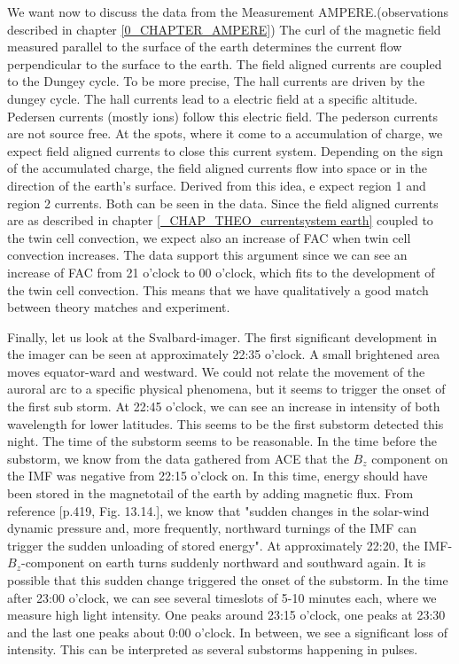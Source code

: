 \documentclass[10pt,a4paper]{article}
\begin{document}
We want now to discuss the data from the Measurement AMPERE.(observations described in chapter \ref{0_CHAPTER_AMPERE}) The  curl of the magnetic field measured parallel 
to the surface of the earth determines the current flow perpendicular to the surface to the earth. The field aligned currents are coupled to the Dungey cycle. To be more precise, The hall currents are driven by the dungey cycle. The hall currents lead to a electric field at a specific altitude. Pedersen currents (mostly ions) follow this electric field. The pederson currents are not source free. At the spots, where it come to a accumulation of charge, we expect field aligned currents to close this current system. Depending on the sign of the accumulated charge, the field aligned currents flow into space or in the direction of the earth's surface. 
Derived from this idea, e expect region 1 and region 2 currents. Both can be seen in the data. Since the field aligned currents are as described in chapter \ref{_CHAP_THEO_currentsystem earth} coupled to the twin cell convection, we expect also an increase of FAC when twin cell convection increases. The data support this argument since we can see an increase of FAC from 21 o'clock to 00 o'clock, which fits to the development of the twin cell convection. 
This means that we have qualitatively a good match between theory matches and experiment.

Finally, let us look at the Svalbard-imager. The first significant development in the imager can be seen at approximately 22:35 o'clock. A small brightened area moves equator-ward and westward. We could not relate the movement of the auroral arc to a specific physical phenomena, but it seems to trigger the onset of the first sub storm. At 22:45 o'clock, we can see an increase in intensity of both wavelength for lower latitudes. This seems to be the first substorm detected this 
night. The time of the substorm seems to be reasonable. In the time before the substorm, we know from the data gathered from ACE that the $B_z$ component on the IMF was negative from 22:15 o'clock on. In this time, energy should have been stored in the magnetotail of the earth by adding magnetic flux. 
From reference \cite{Buch2}[p.419, Fig. 13.14.], we know that "sudden changes in the solar-wind dynamic pressure and, more frequently, northward turnings of the IMF can trigger the sudden unloading of stored energy". At approximately 22:20, the IMF-$B_z$-component on earth turns suddenly northward and southward again. It is possible that this sudden change triggered the onset of the substorm. In the time after 23:00 o'clock, we can see several timeslots of 5-10 minutes each, where we measure 
high light intensity. One peaks around 23:15 o'clock, one peaks at 23:30 and the last one peaks about 0:00 o'clock. In between, we see a significant loss of intensity. 
This can be interpreted as several substorms happening in pulses. 
\end{document}

